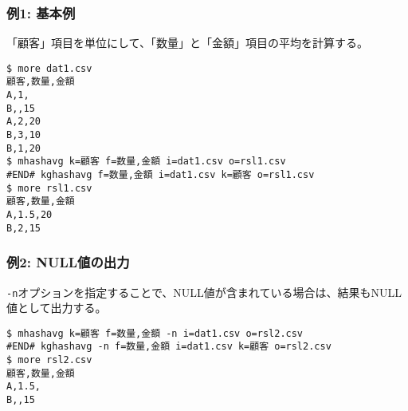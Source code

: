 \subsubsection*{例1: 基本例}

「顧客」項目を単位にして、「数量」と「金額」項目の平均を計算する。


\begin{Verbatim}[baselinestretch=0.7,frame=single]
$ more dat1.csv
顧客,数量,金額
A,1,
B,,15
A,2,20
B,3,10
B,1,20
$ mhashavg k=顧客 f=数量,金額 i=dat1.csv o=rsl1.csv
#END# kghashavg f=数量,金額 i=dat1.csv k=顧客 o=rsl1.csv
$ more rsl1.csv
顧客,数量,金額
A,1.5,20
B,2,15
\end{Verbatim}
\subsubsection*{例2: NULL値の出力}

\verb|-n|オプションを指定することで、NULL値が含まれている場合は、結果もNULL値として出力する。


\begin{Verbatim}[baselinestretch=0.7,frame=single]
$ mhashavg k=顧客 f=数量,金額 -n i=dat1.csv o=rsl2.csv
#END# kghashavg -n f=数量,金額 i=dat1.csv k=顧客 o=rsl2.csv
$ more rsl2.csv
顧客,数量,金額
A,1.5,
B,,15
\end{Verbatim}
